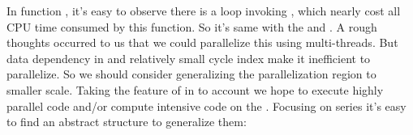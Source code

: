 \documentclass{article}
\begin{document}
\noindent{}In function , it's easy to observe there is a loop invoking , which nearly cost all CPU time consumed by this function. So it's same with the  and . A rough thoughts occurred to us that we could parallelize this  using multi-threads. But data dependency in  and relatively small cycle index make it inefficient to parallelize. So   we should consider generalizing the parallelization region to smaller scale. Taking the feature of  in to account we hope to execute highly parallel code and/or compute intensive code on the . Focusing on  series it's easy to find an abstract structure to generalize them:%
\end{document}
